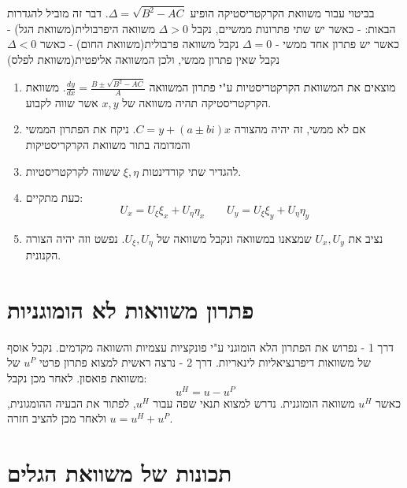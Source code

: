 \documentclass{tstextbook}
\begin{document}
\begin{definition}
בביטוי עבור משוואת הקרקטריסטיקה הופיע \(\Delta=\sqrt{B^2-AC}\). דבר זה מוביל להגדרות הבאות:
- כאשר יש שתי פתרונות ממשיים, נקבל \(\Delta>0\) משוואה היפרבולית(משוואת הגל)
- כאשר יש פתרון אחד ממשי - \(\Delta=0\) נקבל משוואה פרבולית(משוואת החום)
- כאשר \(\Delta<0\) נקבל שאין פתרון ממשי, ולכן המשוואה אליפטית(משוואת לפלס)

\end{definition}
\begin{proposition}
  \begin{enumerate}
    \item מוצאים את המשוואת הקרקטריסטיות ע"י פתרון המשוואה \(\frac{dy}{dx}=\frac{ B\pm \sqrt{ B^2-AC } }{A}\). משוואת הקרקטריסטיקה תהיה משוואה של \(x,y\) אשר שווה לקבוע. 


    \item אם לא ממשי, זה יהיה מהצורה \(C=y+\left( a\pm bi \right)x\). ניקח את הפתרון הממשי והמדומה בתור משוואת הקרקריסטיקות 


    \item להגדיר שתי קורדינטות \(\xi,\eta\) ששווה לקרקטריסטיות. 


    \item כעת מתקיים: 
$$U_{x}=U_{\xi}\xi_{x}+U_{\eta}\eta_{x}\qquad U_{y}=U_{\xi}\xi_{y}+U_{\eta}\eta_{y}$$


    \item נציב את \(U_{x},U_{y}\) שמצאנו במשוואה ונקבל משוואה של \(U_{\xi},U_{\eta}\). נפשט וזה יהיה הצורה הקנונית.  


  \end{enumerate}
\end{proposition}
\section{פתרון משוואות לא הומוגניות}

\begin{proposition}
דרך 1 - נפרוש את הפתרון הלא הומוגני ע"י פונקציות עצמיות והשוואה מקדמים. נקבל אוסף של משוואות דיפרנציאליות לינאריות.
דרך 2 - נרצה ראשית למצוא פתרון פרטי \(u^P\) של משוואת פואסון. לאחר מכן נקבל:
$$u^H=u-u^P$$
כאשר \(u^H\) משוואה הומוגנית. נדרש למצוא תנאי שפה עבור \(u^H\), לפתור את הבעיה ההומגונית, ולאחר מכן להציב חזרה \(u=u^H+u^P\).

\end{proposition}

\section{תכונות של משוואת הגלים}
\end{document}
